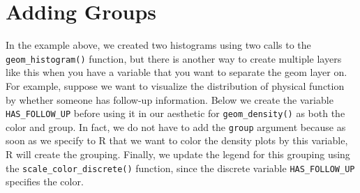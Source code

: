 \documentclass[
  letterpaper,
]{krantz}
\makeatletter
\newenvironment{Shaded}{\begin{snugshade}}{\end{snugshade}}
\newcommand{\AttributeTok}[1]{\textcolor[rgb]{0.40,0.45,0.13}{#1}}
\newcommand{\DecValTok}[1]{\textcolor[rgb]{0.68,0.00,0.00}{#1}}
\newcommand{\FunctionTok}[1]{\textcolor[rgb]{0.28,0.35,0.67}{#1}}
\newcommand{\NormalTok}[1]{\textcolor[rgb]{0.00,0.23,0.31}{#1}}
\newcommand{\OtherTok}[1]{\textcolor[rgb]{0.00,0.23,0.31}{#1}}
\newcommand{\SpecialCharTok}[1]{\textcolor[rgb]{0.37,0.37,0.37}{#1}}
\newcommand{\StringTok}[1]{\textcolor[rgb]{0.13,0.47,0.30}{#1}}
\newenvironment{kframe}{%
\medskip{}
\setlength{\fboxsep}{.8em}
 \def\at@end@of@kframe{}%
 \ifinner\ifhmode%
  \def\at@end@of@kframe{\end{minipage}}%
  \begin{minipage}{\columnwidth}%
 \fi\fi%
 \def\FrameCommand##1{\hskip\@totalleftmargin \hskip-\fboxsep
 \colorbox{shadecolor}{##1}\hskip-\fboxsep
     \hskip-\linewidth \hskip-\@totalleftmargin \hskip\columnwidth}%
 \MakeFramed {\advance\hsize-\width
   \@totalleftmargin\z@ \linewidth\hsize
   \@setminipage}}%
 {\par\unskip\endMakeFramed%
 \at@end@of@kframe}
\renewenvironment{Shaded}{\begin{kframe}}{\end{kframe}}
\makeatother
\begin{document}
\hypertarget{adding-groups}{%
\section{Adding Groups}\label{adding-groups}}

In the example above, we created two histograms using two calls to the
\texttt{geom\_histogram()} function, but there is another way to create
multiple layers like this when you have a variable that you want to
separate the geom layer on. For example, suppose we want to visualize
the distribution of physical function by whether someone has follow-up
information. Below we create the variable \texttt{HAS\_FOLLOW\_UP}
before using it in our aesthetic for \texttt{geom\_density()} as both
the color and group. In fact, we do not have to add the \texttt{group}
argument because as soon as we specify to R that we want to color the
density plots by this variable, R will create the grouping. Finally, we
update the legend for this grouping using the
\texttt{scale\_color\_discrete()} function, since the discrete variable
\texttt{HAS\_FOLLOW\_UP} specifies the color.

\begin{Shaded}
\end{Shaded}
\end{document}
